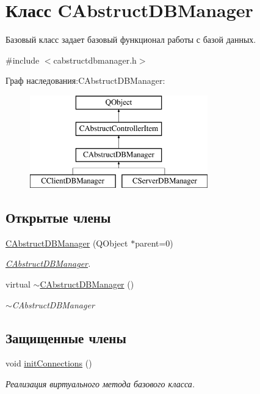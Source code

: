\hypertarget{class_c_abstruct_d_b_manager}{}\section{Класс C\+Abstruct\+D\+B\+Manager}
\label{class_c_abstruct_d_b_manager}


Базовый класс задает базовый функционал работы с базой данных.  




{\ttfamily \#include $<$cabstructdbmanager.\+h$>$}

Граф наследования\+:C\+Abstruct\+D\+B\+Manager\+:\begin{figure}[H]
\begin{center}
\leavevmode
\includegraphics[height=4.000000cm]{class_c_abstruct_d_b_manager}
\end{center}
\end{figure}
\subsection*{Открытые члены}
\begin{DoxyCompactItemize}
\item 
\hyperlink{class_c_abstruct_d_b_manager_a53c2018cfa7a1a24bacd747967509bd7}{C\+Abstruct\+D\+B\+Manager} (Q\+Object $\ast$parent=0)
\begin{DoxyCompactList}\small\item\em \hyperlink{class_c_abstruct_d_b_manager}{C\+Abstruct\+D\+B\+Manager}. \end{DoxyCompactList}\item 
virtual \hyperlink{class_c_abstruct_d_b_manager_a75785e87f1f6dcb6cc2d48d4eced257b}{$\sim$\+C\+Abstruct\+D\+B\+Manager} ()
\begin{DoxyCompactList}\small\item\em $\sim$\+C\+Abstruct\+D\+B\+Manager \end{DoxyCompactList}\end{DoxyCompactItemize}
\subsection*{Защищенные члены}
\begin{DoxyCompactItemize}
\item 
void \hyperlink{class_c_abstruct_d_b_manager_ad450c557df6d9a7dfcc4a37082f35659}{init\+Connections} ()
\begin{DoxyCompactList}\small\item\em Реализация виртуального метода базового класса. \end{DoxyCompactList}\end{DoxyCompactItemize}
